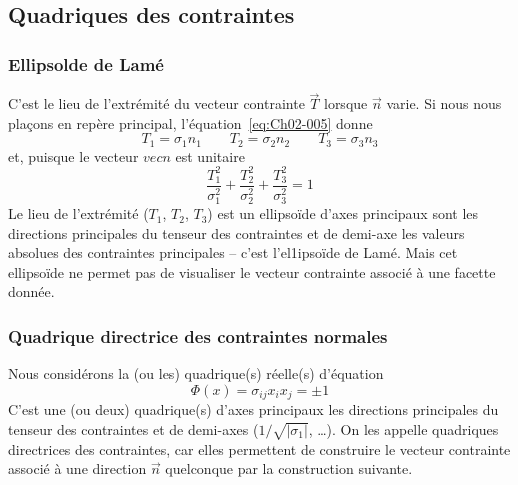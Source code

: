 \subsection{Quadriques des contraintes} \label{ssec:Ch02-2.1}
\subsubsection{Ellipsolde de Lamé}
C'est le lieu de l'extrémité du vecteur contrainte $\vec{T}$ lorsque $\vec{n}$ varie.
Si nous nous plaçons en repère principal, l'équation~\eqref{eq:Ch02-005} donne 
\begin{equation*}
    T_1 = \sigma_1 n_1 \qquad T_2 = \sigma_2 n_2 \qquad T_3 = \sigma_3 n_3
\end{equation*}
et, puisque le vecteur $vec{n}$ est unitaire 
\begin{equation}
    \frac{T_1^2}{\sigma_1^2} + \frac{T_2^2}{\sigma_2^2} + \frac{T_3^2}{\sigma_3^2} = 1
    \label{eq:Ch02-023}
\end{equation}
Le lieu de l'extrémité ($T_1$, $T_2$, $T_3$) est un ellipsoïde d'axes principaux sont les directions principales du tenseur des contraintes et de demi-axe les valeurs absolues des contraintes principales -- c'est l'el1ipsoïde de Lamé.
Mais cet ellipsoïde ne permet pas de visualiser le vecteur contrainte associé à une facette donnée.
\subsubsection{Quadrique directrice des contraintes normales}
Nous considérons la (ou les) quadrique(s) réelle(s) d'équation 
\begin{equation}
    \Phi(x) = \sigma_{ij} x_i x_j = \pm 1
    \label{eq:Ch02-024}
\end{equation}
C'est une (ou deux) quadrique(s) d'axes principaux les directions principales du tenseur des contraintes et de demi-axes ($1/\sqrt{|\sigma_1|}$, \ldots).
On les appelle quadriques directrices des contraintes, car elles permettent de construire le vecteur contrainte associé à une direction $\vec{n}$ quelconque par la construction suivante. 

